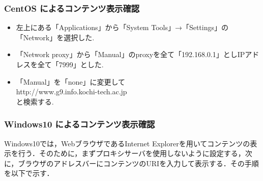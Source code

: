 \documentclass[a4j,titlepage]{jarticle}
\begin{document}
  \subsubsection{CentOS によるコンテンツ表示確認}
\begin{itemize}
\item 左上にある「Applications」から「System Tools」→「Settings」の「Network」を選択した.\\
\item 「Network proxy」から「Manual」のproxyを全て「192.168.0.1」としIPアドレスを全て「7999」とした.\\
\item 「Manual」を「none」に変更して\\
  http://www.g9.info.kochi-tech.ac.jp\\
  と検索する.\\
\end{itemize}

  \subsubsection{Windows10 によるコンテンツ表示確認}
Windows10では，WebブラウザであるInternet Explorerを用いてコンテンツの表示を行う．そのために，まずプロキシサーバを使用しないように設定する，次に，ブラウザのアドレスバーにコンテンツのURIを入力して表示する．その手順を以下で示す．
\end{document}
